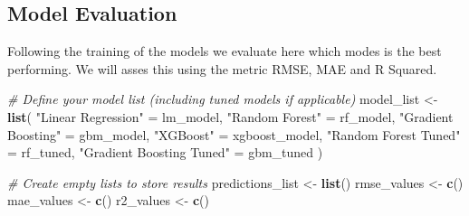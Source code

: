 \documentclass[
]{article}
\newenvironment{Shaded}{\begin{snugshade}}{\end{snugshade}}
\newcommand{\CommentTok}[1]{\textcolor[rgb]{0.56,0.35,0.01}{\textit{#1}}}
\newcommand{\FunctionTok}[1]{\textcolor[rgb]{0.13,0.29,0.53}{\textbf{#1}}}
\newcommand{\NormalTok}[1]{#1}
\newcommand{\OtherTok}[1]{\textcolor[rgb]{0.56,0.35,0.01}{#1}}
\newcommand{\StringTok}[1]{\textcolor[rgb]{0.31,0.60,0.02}{#1}}
\begin{document}
\subsection{Model Evaluation}\label{model-evaluation}

Following the training of the models we evaluate here which modes is the
best performing. We will asses this using the metric RMSE, MAE and R
Squared.

\begin{Shaded}
\begin{Highlighting}[]
\CommentTok{\# Define your model list (including tuned models if applicable)}
\NormalTok{model\_list }\OtherTok{\textless{}{-}} \FunctionTok{list}\NormalTok{(}
  \StringTok{"Linear Regression"} \OtherTok{=}\NormalTok{ lm\_model,}
  \StringTok{"Random Forest"} \OtherTok{=}\NormalTok{ rf\_model,}
  \StringTok{"Gradient Boosting"} \OtherTok{=}\NormalTok{ gbm\_model,}
  \StringTok{"XGBoost"} \OtherTok{=}\NormalTok{ xgboost\_model,}
  \StringTok{"Random Forest Tuned"} \OtherTok{=}\NormalTok{ rf\_tuned,}
  \StringTok{"Gradient Boosting Tuned"} \OtherTok{=}\NormalTok{ gbm\_tuned}
\NormalTok{)}

\CommentTok{\# Create empty lists to store results}
\NormalTok{predictions\_list }\OtherTok{\textless{}{-}} \FunctionTok{list}\NormalTok{()}
\NormalTok{rmse\_values }\OtherTok{\textless{}{-}} \FunctionTok{c}\NormalTok{()}
\NormalTok{mae\_values }\OtherTok{\textless{}{-}} \FunctionTok{c}\NormalTok{()}
\NormalTok{r2\_values }\OtherTok{\textless{}{-}} \FunctionTok{c}\NormalTok{()}


\end{Highlighting}
\end{Shaded}
\end{document}
